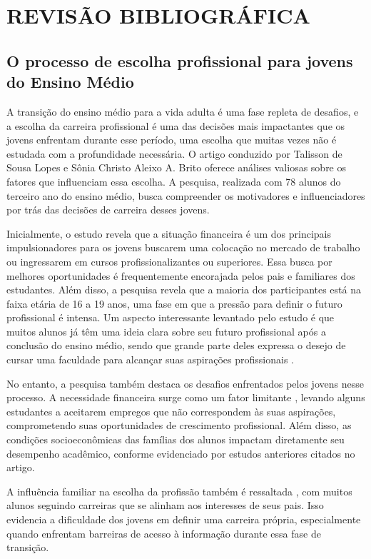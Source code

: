 \chapter{REVISÃO BIBLIOGRÁFICA}
\label{fases-da-disciplina}


\section{O processo de escolha profissional para jovens do Ensino Médio}

A transição do ensino médio para a vida adulta é uma fase repleta de desafios, e a escolha da carreira profissional é uma das decisões mais impactantes que os jovens enfrentam durante esse período, uma escolha que muitas vezes não é estudada com a profundidade necessária. O artigo conduzido por Talisson de Sousa Lopes e Sônia Christo Aleixo A. Brito   oferece análises valiosas sobre os fatores que influenciam essa escolha. A pesquisa, realizada com 78 alunos do terceiro ano do ensino médio, busca compreender os motivadores e influenciadores por trás das decisões de carreira desses jovens.

Inicialmente, o estudo revela que a situação financeira é um dos principais impulsionadores para os jovens buscarem uma colocação no mercado de trabalho ou ingressarem em cursos profissionalizantes ou superiores. Essa busca por melhores oportunidades é frequentemente encorajada pelos pais e familiares dos estudantes.
Além disso, a pesquisa revela que a maioria dos participantes está na faixa etária de 16 a 19 anos, uma fase em que a pressão para definir o futuro profissional é intensa. Um aspecto interessante levantado pelo estudo é que muitos alunos já têm uma ideia clara sobre seu futuro profissional após a conclusão do ensino médio, sendo que grande parte deles expressa o desejo de cursar uma faculdade para alcançar suas aspirações profissionais \cite{lopes2022fim}.

No entanto, a pesquisa também destaca os desafios enfrentados pelos jovens nesse processo. A necessidade financeira surge como um fator limitante \cite{lopes2022fim}, levando alguns estudantes a aceitarem empregos que não correspondem às suas aspirações, comprometendo suas oportunidades de crescimento profissional. Além disso, as condições socioeconômicas das famílias dos alunos impactam diretamente seu desempenho acadêmico, conforme evidenciado por estudos anteriores citados no artigo.

A influência familiar na escolha da profissão também é ressaltada \cite{lopes2022fim}, com muitos alunos seguindo carreiras que se alinham aos interesses de seus pais. Isso evidencia a dificuldade dos jovens em definir uma carreira própria, especialmente quando enfrentam barreiras de acesso à informação durante essa fase de transição.


